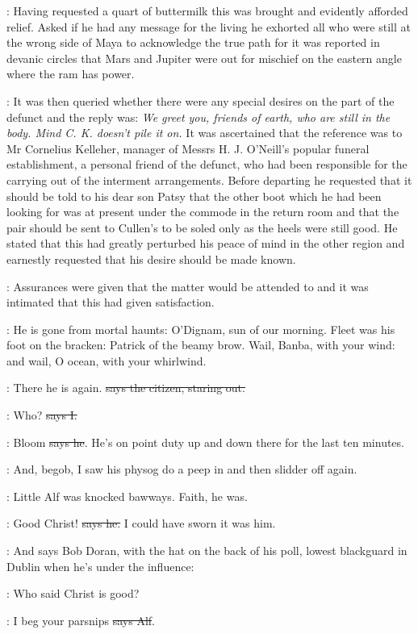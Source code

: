 :
Having requested a quart of buttermilk this was
brought and evidently afforded relief. Asked if he had any message
for the living he exhorted all who were still at the wrong side of Maya
to acknowledge the true path for it was reported in devanic circles that
Mars and Jupiter were out for mischief on the eastern angle where the
ram has power.%

:
It was then queried whether there were any special
desires on the part of the defunct and the reply was: \emph{We greet you,
friends of earth, who are still in the body. Mind C. K. doesn't pile it
on.} It was ascertained that the reference was to Mr Cornelius Kelleher,
manager of Messrs H. J. O'Neill's popular funeral establishment, a
personal friend of the defunct, who had been responsible for the carrying
out of the interment arrangements. Before departing he requested that it
should be told to his dear son Patsy that the other boot which he had been
looking for was at present under the commode in the return room and that
the pair should be sent to Cullen's to be soled only as the heels were
still good.%
He stated that this had greatly perturbed his peace of mind in
the other region and earnestly requested that his desire should be made
known.

:
Assurances were given that the matter would be attended to and it was
intimated that this had given satisfaction.

:
He is gone from mortal haunts: O'Dignam, sun of our morning. Fleet
was his foot on the bracken: Patrick of the beamy brow. Wail, Banba, with
your wind: and wail, O ocean, with your whirlwind.

\citizen:
There he is again.
\sout{says the citizen, staring out.}

:
Who? \sout{says I.}

\citizen:
Bloom \sout{says he}.
He's on point duty up and down there for the last ten
minutes.%

\Nq:
And, begob, I saw his physog do a peep in
and then slidder off again.

\Nq:
Little Alf was knocked bawways. Faith, he was.

\bergan:
Good Christ! \sout{says he.}
I could have sworn it was him.

\Nq:
And says Bob Doran, with the hat on the back of his poll, lowest
blackguard in Dublin when he's under the influence:

\doran:
Who said Christ is good?

\bergan:
I beg your parsnips \sout{says Alf}.

